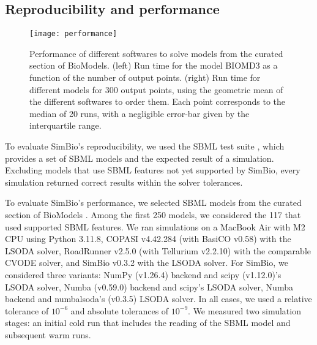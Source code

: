 \documentclass[namedate,numsec,webpdf,modern,large]{oup-authoring-template}
\theoremstyle{thmstyleone}%
\theoremstyle{thmstyletwo}%
\theoremstyle{thmstylethree}%
\begin{document}
\subsection{Reproducibility and performance}
\label{reproducibility-and-performance}

\begin{figure*}[t]
  \centering
  \texttt{[image: performance]}
  \caption{
    Performance of different softwares to solve models from the curated section of BioModels.
    (left) Run time for the model BIOMD3 as a function of the number of output points.
    (right) Run time for different models for 300 output points,
    using the geometric mean of the different softwares to order them.
    Each point corresponds to the median of 20 runs,
    with a negligible error-bar given by the interquartile range.
  }
  \label{fig-runtime}
\end{figure*}

To evaluate SimBio's reproducibility,
we used the \ac{SBML} test suite \citep{SBMLTestSuite},
which provides a set of \ac{SBML} models
and the expected result of a simulation.
Excluding models that use \ac{SBML} features not yet supported by SimBio,
every simulation returned correct results within the solver tolerances.

To evaluate SimBio's performance,
we selected \ac{SBML} models from the curated section of BioModels \citep{malik-sheriffBioModels15Years2020}.
Among the first 250 models,
we considered the 117 that used supported \ac{SBML} features.
We ran simulations
on a MacBook Air with M2 CPU
using Python 3.11.8,
COPASI v4.42.284
(with BasiCO v0.58) with the LSODA solver,
RoadRunner v2.5.0 (with Tellurium v2.2.10) with the comparable CVODE solver, and
SimBio v0.3.2 with the LSODA solver.
For SimBio, we considered three variants:
NumPy (v1.26.4) backend and scipy (v1.12.0)'s LSODA solver,
Numba (v0.59.0) backend and scipy's LSODA solver,
Numba backend and numbalsoda's (v0.3.5) LSODA solver.
In all cases, we used a relative tolerance of \(10^{-6}\) and absolute tolerances of \(10^{-9}\).
We measured two simulation stages:
an initial cold run that includes the reading of the \ac{SBML} model
and subsequent warm runs.
\end{document}
